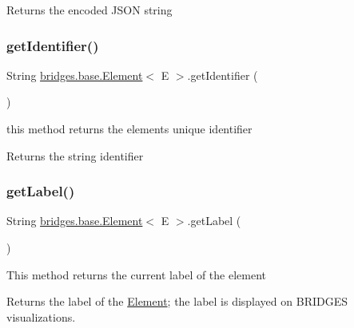 \begin{DoxyReturn}{Returns}
the encoded J\+S\+ON string 
\end{DoxyReturn}
\mbox{\label{classbridges_1_1base_1_1_element_ad5496f568b4cca3909800eceea5fb47d}} 
\subsubsection{\texorpdfstring{get\+Identifier()}{getIdentifier()}}
{\footnotesize\ttfamily String \hyperlink{classbridges_1_1base_1_1_element}{bridges.\+base.\+Element}$<$ E $>$.get\+Identifier (\begin{DoxyParamCaption}{ }\end{DoxyParamCaption})}

this method returns the element\textquotesingle{}s unique identifier

\begin{DoxyReturn}{Returns}
the string identifier 
\end{DoxyReturn}
\mbox{\label{classbridges_1_1base_1_1_element_a5c831a0238de487765f6021a887f1542}} 
\subsubsection{\texorpdfstring{get\+Label()}{getLabel()}}
{\footnotesize\ttfamily String \hyperlink{classbridges_1_1base_1_1_element}{bridges.\+base.\+Element}$<$ E $>$.get\+Label (\begin{DoxyParamCaption}{ }\end{DoxyParamCaption})}

This method returns the current label of the element

\begin{DoxyReturn}{Returns}
the label of the \hyperlink{classbridges_1_1base_1_1_element}{Element}; the label is displayed on B\+R\+I\+D\+G\+ES visualizations. 
\end{DoxyReturn}
\mbox{\label{classbridges_1_1base_1_1_element_ae32deb37d1ad95d2fdfaa616062f319d}} 
